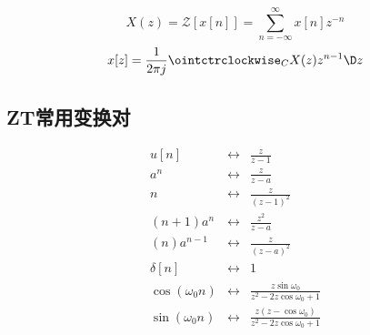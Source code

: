 \vspace{-7pt}
\[X(z) = \mathcal Z[x[n]] = \sum_{n=-\infty}^\infty x[n]z^{-n}\]
\[x[z] = \frac{1}{2\pi j}\ointctrclockwise_C X(z)z^{n-1}\D z\]

\subsection{ZT常用变换对}
\vspace{-7pt}
\[
\begin{array}{lcl}
u[n] & \longleftrightarrow & \frac{z}{z-1} \\
a^n & \longleftrightarrow & \frac{z}{z-a} \\
n & \longleftrightarrow & \frac{z}{(z-1)^2} \\
(n+1)a^n & \longleftrightarrow & \frac{z^2}{z-a} \\
(n)a^{n-1} & \longleftrightarrow & \frac{z}{(z-a)^2} \\
\delta[n] & \longleftrightarrow & 1 \\
\cos(\omega_0 n) & \longleftrightarrow & \frac{z\sin\omega_0}{z^2-2z\cos\omega_0 + 1} \\
\sin(\omega_0 n) & \longleftrightarrow & \frac{z(z-\cos\omega_0)}{z^2-2z\cos\omega_0 + 1} \\
\end{array}
\]

